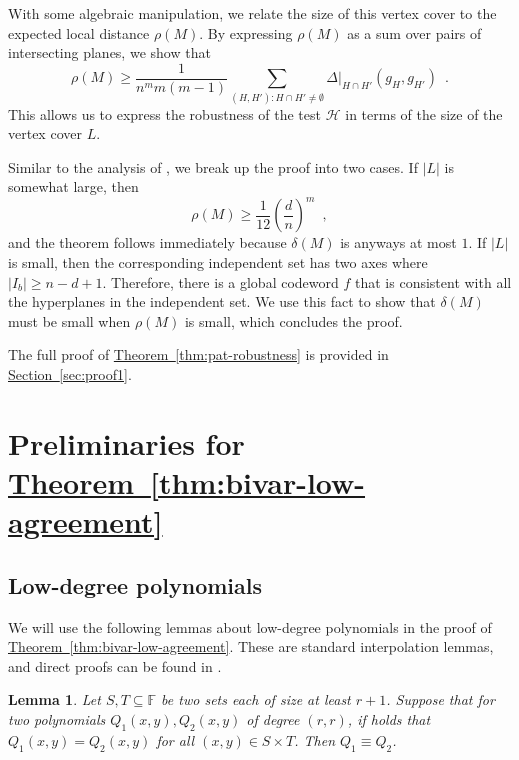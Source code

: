 \documentclass[11pt]{article}
\numberwithin{equation}{section}
\newtheorem{lemma}[theorem]{Lemma}
\theoremstyle{definition}
\theoremstyle{plain}
\newcommand{\expref}[2]{\hyperref[#2]{#1~\ref{#2}}}
\theoremstyle{plain}
\newcommand{\colored}{}
\newcommand{\reldist}{\colored{\delta}}
\newcommand{\robust}{\colored{\rho}} %
\newcommand{\tester}{\colored{\mathcal H}} %
\newcommand{\plane}{{\colored{H}}} %
\newcommand{\otherplane}{\colored{ {H'}}} %
\newcommand{\hamdist}{\colored{\Delta}} %
\newcommand{\codedist}{\colored{d}} %
\newcommand{\blocklength}{\colored{n}} %
\newcommand{\testerinput}{\colored{M}} %
\newcommand{\closestlocalword}[1]{ \colored{g_{#1}}} %
\newcommand{\closestglobalword}{\colored{f}} %
\newcommand{\Field}{\colored{\mathbb F}}
\newcommand{\degree}{\colored{r}}
\newcommand\abs[1]{\colored{\left|#1\right|}}
\begin{document}
With some algebraic manipulation, we relate the size of this vertex cover to the expected local distance $\robust(\testerinput)$. By expressing $\robust(\testerinput)$ as a sum over pairs of intersecting planes, we show that
\begin{equation*}
\robust(\testerinput) \geq  \frac{1}{\blocklength^{m} m(m-1)} \sum_{(\plane, \otherplane) : \plane \cap \otherplane \ne \emptyset} \hamdist \vert_{\plane \cap \otherplane} (\closestlocalword{\plane}, \closestlocalword{\otherplane}) \enspace.
\end{equation*}
This allows us to express the robustness of the test $\tester$ in terms of the size of the vertex cover $L$.

Similar to the analysis of \cite{Viderman12}, we break up the proof into two cases. If $\abs{L}$ is somewhat large,
then
\[
  \rho(M) \geq \frac{1}{12} \left(\frac{\codedist}{\blocklength}\right)^m\enspace,
\]
and the theorem follows immediately because $\reldist(\testerinput)$
is anyways at most $1$. If $\abs{L}$ is small, then the corresponding
independent set has two axes where
$\abs{I_b} \geq \blocklength - \codedist + 1$. Therefore, there is a
global codeword $\closestglobalword$ that is consistent with all the
hyperplanes in the independent set. We use this fact to show that
$\reldist(\testerinput)$ must be small when $\robust(\testerinput)$ is
small, which concludes the proof.

The full proof of \expref{Theorem}{thm:pat-robustness} is provided in \expref{Section}{sec:proof1}.

%
%

\section{Preliminaries for \expref{Theorem}{thm:bivar-low-agreement}}
\label{sec:prelim-bivar}
\subsection{Low-degree polynomials}
We will use the following lemmas about low-degree polynomials in the proof of \expref{Theorem}{thm:bivar-low-agreement}. These are standard interpolation lemmas, and direct proofs can be found in \cite{PolishchukS94}.

\begin{lemma}\label{lemma:zero poly}
    Let $S,T \subseteq \Field$ be two sets each of size at least $\degree+1$.
    Suppose that for two polynomials $Q_1(x,y), Q_2(x,y)$ of degree $(\degree,\degree)$,
    if holds that $Q_1(x,y) = Q_2(x,y)$ for all $(x,y) \in S \times T$.
    Then $Q_1 \equiv Q_2$.
\end{lemma}
\end{document}
